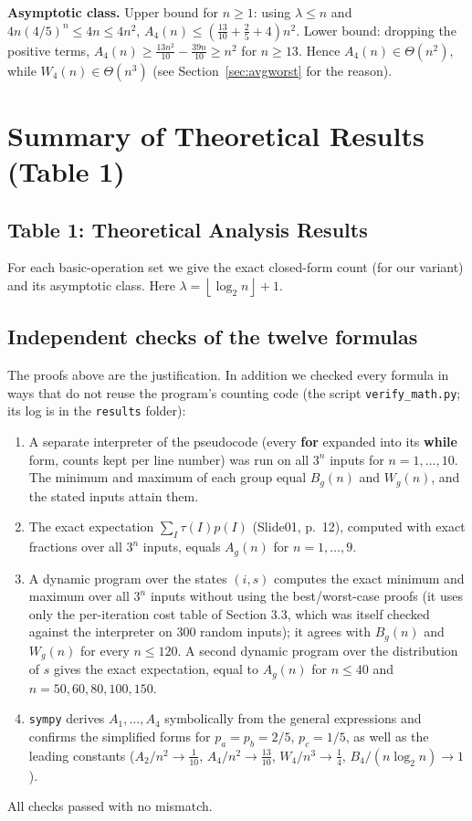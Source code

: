 \documentclass[11pt]{article}
\theoremstyle{remark}
\newcommand{\fl}[1]{\left\lfloor #1\right\rfloor}
\begin{document}
\textbf{Asymptotic class.} Upper bound for $n\ge1$: using $\lambda\le n$ and $4n(4/5)^n\le 4n\le 4n^2$,
$A_4(n)\le(\frac{13}{10}+\frac25+4)n^2$. Lower bound: dropping the positive terms,
$A_4(n)\ge\frac{13n^2}{10}-\frac{39n}{10}\ge n^2$ for $n\ge13$. Hence $A_4(n)\in\Theta(n^2)$, while
$W_4(n)\in\Theta(n^3)$ (see Section~\ref{sec:avgworst} for the reason).

\newpage
\section{Summary of Theoretical Results (Table 1)}
\subsection*{Table 1: Theoretical Analysis Results}
For each basic-operation set we give the exact closed-form count (for our variant) and its asymptotic class.
Here $\lambda=\fl{\log_2 n}+1$.



\subsection{Independent checks of the twelve formulas}
\label{sec:mathcheck}
The proofs above are the justification. In addition we checked every formula in ways that do not reuse the program's
counting code (the script \texttt{verify\_math.py}; its log is in the \texttt{results} folder):
\begin{enumerate}[nosep]
\item A separate interpreter of the pseudocode (every \textbf{for} expanded into its \textbf{while} form, counts kept
per line number) was run on all $3^n$ inputs for $n=1,\dots,10$. The minimum and maximum of each group equal
$B_g(n)$ and $W_g(n)$, and the stated inputs attain them.
\item The exact expectation $\sum_I\tau(I)p(I)$ (Slide01, p.~12), computed with exact fractions over all $3^n$ inputs,
equals $A_g(n)$ for $n=1,\dots,9$.
\item A dynamic program over the states $(i,s)$ computes the exact minimum and maximum over all $3^n$ inputs without
using the best/worst-case proofs (it uses only the per-iteration cost table of Section 3.3, which was itself checked
against the interpreter on 300 random inputs); it agrees with $B_g(n)$ and $W_g(n)$ for every $n\le120$. A second dynamic program over the
distribution of $s$ gives the exact expectation, equal to $A_g(n)$ for $n\le40$ and $n=50,60,80,100,150$.
\item \texttt{sympy} derives $A_1,\dots,A_4$ symbolically from the general expressions and confirms the simplified forms
for $p_a=p_b=2/5$, $p_c=1/5$, as well as the leading constants ($A_2/n^2\to\frac1{10}$, $A_4/n^2\to\frac{13}{10}$,
$W_4/n^3\to\frac14$, $B_4/(n\log_2 n)\to1$).
\end{enumerate}
All checks passed with no mismatch.
\end{document}

